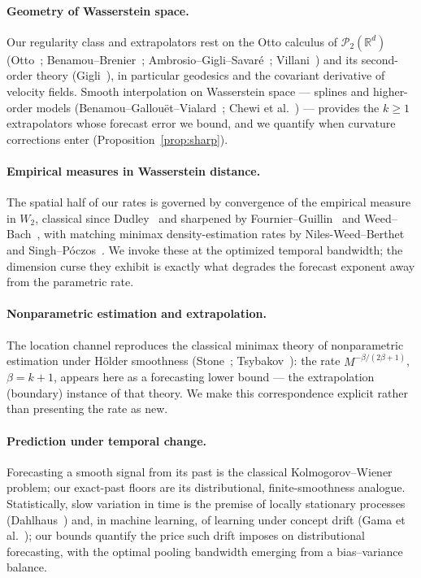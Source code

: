 \documentclass[11pt]{article}
\theoremstyle{definition}
\theoremstyle{remark}
\newcommand{\R}{\mathbb{R}}
\newcommand{\PP}{\mathcal{P}_2(\R^d)}
\begin{document}
\paragraph{Geometry of Wasserstein space.} Our regularity class and extrapolators rest on the
Otto calculus of $\PP$ (Otto~\cite{otto}; Benamou--Brenier~\cite{bb};
Ambrosio--Gigli--Savar\'e~\cite{ags}; Villani~\cite{villani}) and its second-order theory
(Gigli~\cite{gigli}), in particular geodesics and the covariant derivative of velocity fields.
Smooth interpolation on Wasserstein space --- splines and higher-order models
(Benamou--Gallou\"et--Vialard~\cite{bgv}; Chewi et al.~\cite{chewi}) --- provides the $k\ge1$
extrapolators whose forecast error we bound, and we quantify when curvature corrections enter
(Proposition~\ref{prop:sharp}).

\paragraph{Empirical measures in Wasserstein distance.} The spatial half of our rates is governed
by convergence of the empirical measure in $W_2$, classical since Dudley~\cite{dudley} and
sharpened by Fournier--Guillin~\cite{fg} and Weed--Bach~\cite{weedbach}, with matching minimax
density-estimation rates by Niles-Weed--Berthet~\cite{nwb} and Singh--P\'oczos~\cite{sp}. We invoke
these at the optimized temporal bandwidth; the dimension curse they exhibit is exactly what
degrades the forecast exponent away from the parametric rate.

\paragraph{Nonparametric estimation and extrapolation.} The location channel reproduces the
classical minimax theory of nonparametric estimation under H\"older smoothness
(Stone~\cite{stone}; Tsybakov~\cite{tsybakov}): the rate $M^{-\beta/(2\beta+1)}$, $\beta=k+1$,
appears here as a forecasting lower bound --- the extrapolation (boundary) instance of that theory.
We make this correspondence explicit rather than presenting the rate as new.

\paragraph{Prediction under temporal change.} Forecasting a smooth signal from its past is the
classical Kolmogorov--Wiener problem; our exact-past floors are its distributional,
finite-smoothness analogue. Statistically, slow variation in time is the premise of locally
stationary processes (Dahlhaus~\cite{dahlhaus}) and, in machine learning, of learning under
concept drift (Gama et al.~\cite{gama}); our bounds quantify the price such drift imposes on
distributional forecasting, with the optimal pooling bandwidth emerging from a bias--variance
balance.
\end{document}
